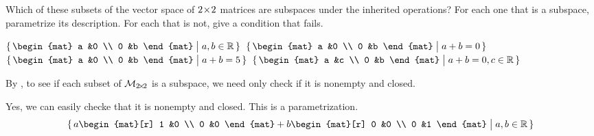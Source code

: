 \begin{exercises}
  \recommended \item
    Which of these subsets of the vector space of \( 2 \! \times \! 2 \) matrices
    are subspaces under the inherited operations?
    For each one that is a subspace, parametrize its description.
    For each that is not, give a condition that fails.
    \begin{exparts}
      \partsitem \( \set{\begin{mat}
                      a  &0  \\
                      0  &b
                    \end{mat}  \suchthat a,b\in\Re}  \)
      \partsitem \( \set{\begin{mat}
                      a  &0  \\
                      0  &b
                    \end{mat}  \suchthat a+b=0} \)
      \partsitem \( \set{\begin{mat}
                      a  &0  \\
                      0  &b
                    \end{mat}  \suchthat a+b=5} \)
      \partsitem \( \set{\begin{mat}
                      a  &c  \\
                      0  &b
                    \end{mat}  \suchthat a+b=0, c\in\Re} \)
    \end{exparts}
    \begin{answer}
      By , to see if each
      subset of $\mathcal{M}_{2 \! \times \! 2}$ is a subspace, we need only
      check if it is nonempty and closed.
      \begin{exparts}
        \partsitem Yes, we can easily checke that it is nonempty and closed.
          This is a parametrization.
          \begin{equation*}
            \set{a\begin{mat}[r]
                    1  &0  \\
                    0  &0
                  \end{mat}
                 +b\begin{mat}[r]
                    0  &0  \\
                    0  &1  
                   \end{mat}
                 \suchthat a,b\in\Re}
          \end{equation*}

\end{exparts}
\end{answer}
\end{exercises}
